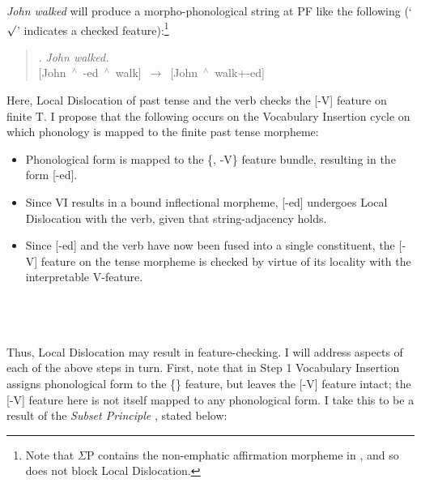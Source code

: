 {\it John walked} will produce a morpho-phonological string at PF like the following (`$\surd$' indicates a checked feature):\footnote{Note that $\Sigma$P contains the non-emphatic affirmation morpheme in \Next, and so does not block Local Dislocation.}

\singlespacing
\begin{quote}
\ex. {\it John walked.}\\
\mbox{[John $^{\wedge}$ -ed\raisebox{-3pt}{\footnotesize{[-V]}} $^{\wedge}$ walk\raisebox{-3pt}{\footnotesize{[{\it +v}, +V]}}] $\rightarrow$ [John $^{\wedge}$ walk\raisebox{-3pt}{\footnotesize{[{\it +v}, +V]}}+-ed\raisebox{-3pt}{\footnotesize{[-V]$\surd$}}]}

\end{quote}
\onehalfspacing
Here, Local Dislocation of past tense and the verb checks the [-V] feature on finite T. I propose that the following occurs on the Vocabulary Insertion cycle on which phonology is mapped to the finite past tense morpheme:

\singlespacing
\begin{minipage}{5in}
\begin{itemize}
\item[1.] Phonological form is mapped to the \{\mbox{}, -V\} feature bundle, resulting in the form [-ed]\raisebox{-3pt}{\footnotesize{[-V]}}.
\item[2.] Since VI results in a bound inflectional morpheme, [-ed]\raisebox{-3pt}{\footnotesize{[-V]}} undergoes Local Dislocation with the verb, given that string-adjacency holds.
\item[3.] Since [-ed]\raisebox{-3pt}{\footnotesize{[-V]}} and the verb have now been fused into a single constituent, the [-V] feature on the tense morpheme is checked by virtue of its locality with the interpretable V-feature.

\end{itemize}
\end{minipage}\\\\\\
\onehalfspacing
Thus, Local Dislocation may result in feature-checking. I will address aspects of each of the above steps in turn. First, note that in Step 1 Vocabulary Insertion assigns phonological form to the \{\mbox{}\} feature, but leaves the [-V] feature intact; the [-V] feature here is not itself mapped to any phonological form. I take this to be a result of the {\it Subset Principle} \citep{halle_marantz1993}, stated below:

